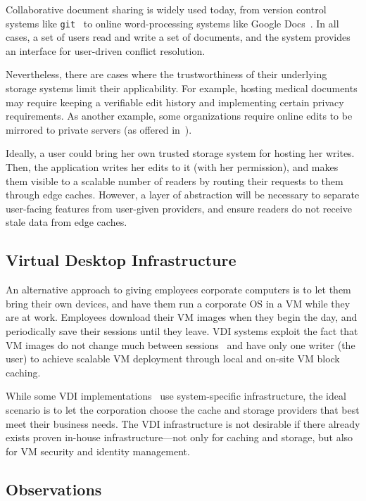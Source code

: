 Collaborative document sharing is widely used today, from 
version control systems like {\tt git}~\cite{git} to online word-processing
systems like Google Docs~\cite{google-docs}.  In all cases, a set of 
users read and write a set of documents, and the system provides an 
interface for user-driven conflict resolution.

Nevertheless, there are cases where
the trustworthiness of their underlying storage systems limit their applicability.  For example,
hosting medical documents may require keeping a verifiable
edit history and implementing certain privacy requirements.  As another
example, some organizations require 
online edits to be mirrored to private servers (as offered in~\cite{Box.net}).

Ideally, a user could bring her own trusted storage system for hosting her writes.
Then, the application writes her edits to it (with her permission), and makes
them visible to a scalable number of readers by routing their requests
to them through edge caches.  However, a layer of abstraction
will be necessary to separate user-facing features
from user-given providers, and ensure readers do not receive
stale data from edge caches.

\subsection{Virtual Desktop Infrastructure}

An alternative approach to giving employees corporate computers
is to let them bring their own devices, and have them run a corporate OS
in a VM while they are at work.  Employees download their VM images
when they begin the day, and periodically save their sessions until 
they leave.  VDI systems exploit the fact that VM images 
do not change much between sessions~\cite{collective} and have only
one writer (the user) to achieve scalable VM deployment
through local and on-site VM block caching.

While some VDI implementations~\cite{citrix,mokafive} use system-specific
infrastructure, the ideal scenario is to let the corporation
choose the cache and storage providers that best meet their
business needs.  The VDI infrastructure is not desirable
if there already exists proven in-house infrastructure---not only 
for caching and storage, but also for VM security and identity management.

\subsection{Observations}


